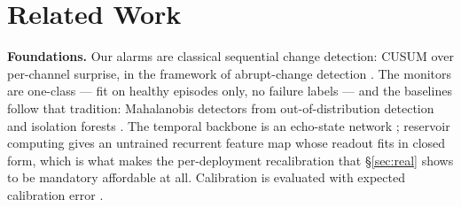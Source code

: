 \documentclass{article}
\begin{document}
\section{Related Work}

\textbf{Foundations.} Our alarms are classical sequential change detection: CUSUM \cite{page1954cusum} over per-channel surprise, in the framework of abrupt-change detection \cite{basseville1993detection}. The monitors are one-class \cite{chandola2009anomaly} --- fit on healthy episodes only, no failure labels --- and the baselines follow that tradition: Mahalanobis detectors from out-of-distribution detection \cite{lee2018simple,hendrycks2017baseline} and isolation forests \cite{liu2008isolation}. The temporal backbone is an echo-state network \cite{jaeger2001echo}; reservoir computing \cite{lukosevicius2009reservoir} gives an untrained recurrent feature map whose readout fits in closed form, which is what makes the per-deployment recalibration that \S\ref{sec:real} shows to be mandatory affordable at all. Calibration is evaluated with expected calibration error \cite{guo2017calibration}.
\end{document}
